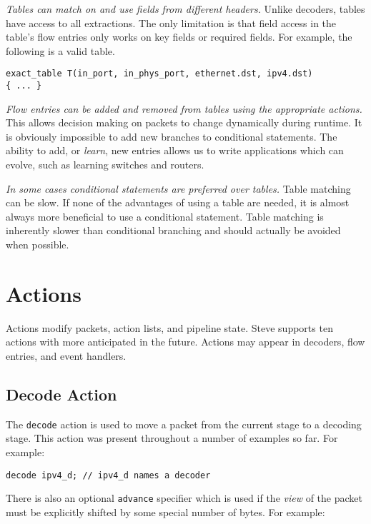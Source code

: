 \textit{Tables can match on and use fields from different headers.} Unlike
decoders, tables have access to all extractions. The only limitation is that
field access in the table's flow entries only works on key fields or required fields. For example, the
following is a valid table.

\begin{lstlisting}
exact_table T(in_port, in_phys_port, ethernet.dst, ipv4.dst)
{ ... }
\end{lstlisting}

\textit{Flow entries can be added and removed from tables using the appropriate
actions.} This allows decision making on packets to change dynamically during
runtime. It is obviously impossible to add new branches to conditional
statements. The ability to add, or \textit{learn}, new entries allows us to
write applications which can evolve, such as learning switches and routers.

\textit{In some cases conditional statements are preferred over tables.} 
Table matching can be slow. If none of the advantages of using a table are 
needed, it is almost always more beneficial to use a conditional statement. Table 
matching is inherently slower than conditional branching and should actually be 
avoided when possible.

\section{Actions} \label{tut:action}

Actions modify packets, action lists, and pipeline state. Steve supports ten
actions with more anticipated in the future. Actions may appear in decoders,
flow entries, and event handlers.

\subsection{Decode Action} \label{tut:decode_action}

The \texttt{decode} action is used to move a packet from the current stage to a
decoding stage. This action was present throughout a number of examples so far.
For example:

\begin{lstlisting}
decode ipv4_d; // ipv4_d names a decoder
\end{lstlisting}

There is also an optional \texttt{advance} specifier which is used if
the \textit{view} of the packet must be explicitly shifted by some special
number of bytes. For example:

